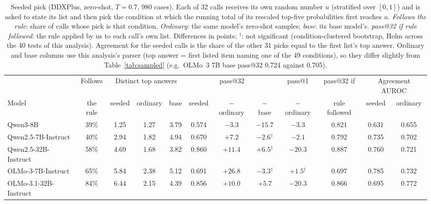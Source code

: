 \documentclass[wcp]{jmlr}
\begin{document}
\begin{table}[t]
\centering\small
\setlength{\tabcolsep}{3.5pt}
\begin{adjustbox}{max width=\linewidth}
\begin{tabular}{lccccccccccc}
\toprule
 & Follows & \multicolumn{3}{c}{Distinct top answers} & \multicolumn{3}{c}{pass@32} & pass@1 & pass@32 if & \multicolumn{2}{c}{Agreement AUROC} \\
Model & the rule & seeded & ordinary & base & seeded & $-$ ordinary & $-$ base & $-$ ordinary & rule followed & seeded & ordinary \\
\midrule
Qwen3-8B & 39\% & 1.25 & 1.27 & 3.79 & 0.574 & $-3.3$ & $-15.7$ & $-3.3$ & 0.821 & 0.631 & 0.655 \\
Qwen2.5-7B-Instruct & 40\% & 2.94 & 1.82 & 4.94 & 0.670 & $+7.2$ & $-2.6$$^{\dagger}$ & $-2.1$ & 0.792 & 0.735 & 0.702 \\
Qwen2.5-32B-Instruct & 58\% & 4.69 & 1.68 & 3.82 & 0.860 & $+11.4$ & $+6.5$$^{\dagger}$ & $-20.3$ & 0.887 & 0.760 & 0.721 \\
OLMo-3-7B-Instruct & 65\% & 5.84 & 2.38 & 5.12 & 0.691 & $+26.8$ & $-3.3$$^{\dagger}$ & $+1.5$$^{\dagger}$ & 0.697 & 0.785 & 0.732 \\
OLMo-3.1-32B-Instruct & 84\% & 6.44 & 2.15 & 4.39 & 0.856 & $+10.0$ & $+5.7$ & $-20.3$ & 0.866 & 0.695 & 0.772 \\
\bottomrule
\end{tabular}
\end{adjustbox}
\caption{Seeded pick (DDXPlus, zero-shot, $T{=}0.7$, 980 cases). Each of 32 calls receives its own random number $u$ (stratified over $[0,1]$) and is asked to state its list and then pick the condition at which the running total of its rescaled top-five probabilities first reaches $u$. \emph{Follows the rule}: share of calls whose pick is that condition. \emph{Ordinary}: the same model's zero-shot samples; \emph{base}: its base model's. \emph{pass@32 if rule followed}: the rule applied by us to each call's own list. Differences in points; $^{\dagger}$: not significant (condition-clustered bootstrap, Holm across the 40 tests of this analysis). Agreement for the seeded calls is the share of the other 31 picks equal to the first list's top answer. Ordinary and base columns use this analysis's parser (top answer = first listed item naming one of the 49 conditions), so they differ slightly from Table~\ref{tab:sampled} (e.g.\ OLMo~3 7B base pass@32 0.724 against 0.705).}
\label{tab:seeded}
\end{table}
\end{document}
